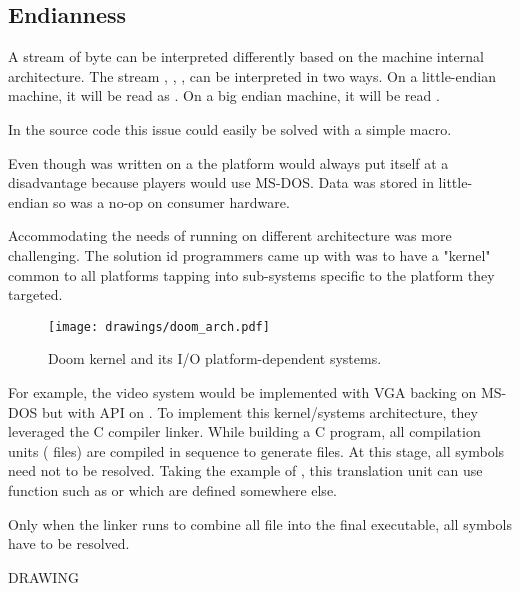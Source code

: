 \subsection{Endianness}
A stream of byte can be interpreted differently based on the machine internal architecture. The stream , , ,  can be interpreted in two ways. On a little-endian machine, it will be read as . On a big endian machine, it will be read .\\
\par
{}
\par
In the source code this issue could easily be solved with a simple macro.\\
\par
{}
\par
Even though \doom was written on a \NeXT the platform would always put itself at a disadvantage because players would use MS-DOS. Data was stored in little-endian so  was a no-op on consumer hardware.\\
\par
{}
\par
Accommodating the needs of running on different architecture was more challenging. The solution id programmers came up with was to have a "kernel" common to all platforms tapping into sub-systems specific to the platform they targeted.\\
\par
\begin{figure}[H]
\centering
\texttt{[image: drawings/doom\_arch.pdf]}
\caption{Doom kernel and its I/O platform-dependent systems.}
\end{figure}
\par
For example, the video system would be implemented with VGA backing on MS-DOS but with  API on \NeXT.
To implement this kernel/systems architecture, they leveraged the C compiler linker. While building a C program, all compilation units ( files) are compiled in sequence to generate  files. At this stage, all symbols need not to be resolved. Taking the example of , this translation unit can use function such as  or  which are defined somewhere else. \\
\par
{}
\par
Only when the linker runs to combine all  file into the final executable, all symbols have to be resolved.\\
\par
DRAWING\\
\pagebreak






